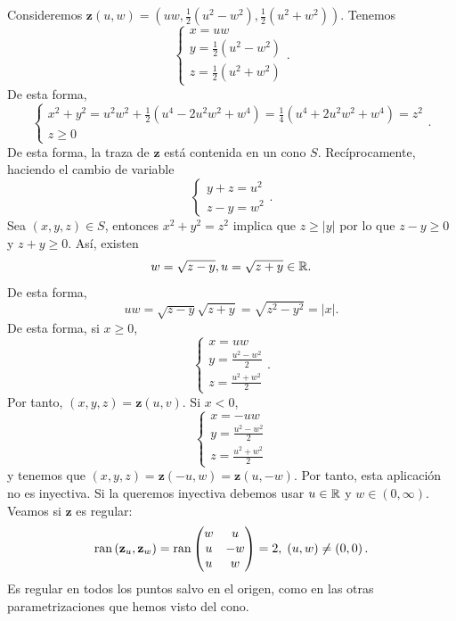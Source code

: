 \begin{eg}
Consideremos $\displaystyle \textbf{z} \left(u,w\right)=\left(uw, \frac{1}{2}\left(u^{2}-w^{2}\right), \frac{1}{2}\left(u^{2} + w^{2}\right)\right) $. Tenemos 
\[
\begin{cases}
x = uw \\
y = \frac{1}{2}\left(u^{2}-w^{2}\right) \\
z = \frac{1}{2}\left(u^{2} + w^{2}\right)
\end{cases}
.\]
De esta forma, 
\[ 
\begin{cases}
x^{2}+y^{2}=u^{2}w^{2}+\frac{1}{2}\left(u^{4}-2u^{2}w^{2}+w^{4}\right)=\frac{1}{4}\left(u^{4}+2u^{2}w^{2}+w^{4}\right) = z^{2} \\
z \geq 0
\end{cases}
.\]
De esta forma, la traza de $\displaystyle \textbf{z}  $ está contenida en un cono $\displaystyle S $. Recíprocamente, haciendo el cambio de variable 
\[ 
\begin{cases}
y +z =u^{2} \\
z-y = w^{2}
\end{cases}
.\]
Sea $\displaystyle \left(x,y,z\right)\in S $, entonces $\displaystyle x^{2} +y^{2} = z^{2} $ implica que $\displaystyle z \geq \left|y\right| $ por lo que $\displaystyle z -y \geq 0 $ y $\displaystyle z +y \geq 0 $. Así, existen 
\[w = \sqrt{z-y}, u = \sqrt{z+y}\in \mathbb{R} .\]
De esta forma, 
\[uw = \sqrt{z-y}\sqrt{z +y}=\sqrt{z^{2}-y^{2}}= \left|x\right| .\]
De esta forma, si $\displaystyle x \geq 0 $, 
\[
\begin{cases}
x = uw \\
y = \frac{u^{2}-w^{2}}{2} \\
z = \frac{u^{2}+w^{2}}{2}
\end{cases}
.\]
Por tanto, $\displaystyle \left(x,y,z\right)= \textbf{z} \left(u,v\right) $. Si $\displaystyle x < 0 $, 
\[
\begin{cases}
x = -uw \\
y = \frac{u^{2}-w^{2}}{2} \\
z = \frac{u^{2} + w^{2}}{2}
\end{cases}
\]
y tenemos que $\displaystyle \left(x,y,z\right)= \textbf{z} \left(-u,w\right) = \textbf{z} \left(u,-w\right)$. 
Por tanto, esta aplicación no es inyectiva. Si la queremos inyectiva debemos usar $\displaystyle u \in \mathbb{R} $ y $\displaystyle w \in \left(0,\infty\right) $. Veamos si $\displaystyle \textbf{z}  $ es regular:
\[\operatorname{ran}\left( \textbf{z} _{u}, \textbf{z} _{w}\right)=\operatorname{ran}\begin{pmatrix} w & u \\ u & - w \\ u & w \end{pmatrix}=2, \; \left(u,w\right)\neq \left(0,0\right) .\]
Es regular en todos los puntos salvo en el origen, como en las otras parametrizaciones que hemos visto del cono. 
\end{eg}

